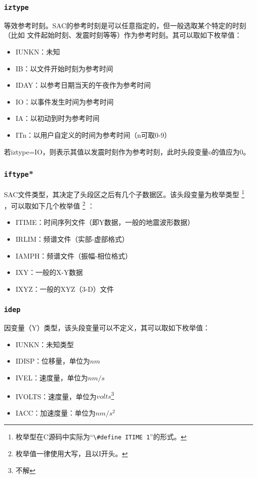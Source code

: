 \subsubsection{\texttt{iztype}}
等效参考时刻。SAC的参考时刻是可以任意指定的，但一般选取某个特定的时刻（比如
文件起始时刻、发震时刻等等）作为参考时刻。其可以取如下枚举值：
\begin{itemize}
\ttfamily
\item IUNKN：未知
\item IB：以文件开始时刻为参考时间
\item IDAY：以参考日期当天的午夜作为参考时间
\item IO：以事件发生时间为参考时间
\item IA：以初动到时为参考时间
\item ITn：以用户自定义的时间为参考时间（n可取0-9）
\end{itemize}

若iztype=IO，则表示其值以发震时刻作为参考时刻，此时头段变量o的值应为0。

\subsubsection{\texttt{iftype}*}
SAC文件类型，其决定了头段区之后有几个子数据区。该头段变量为枚举类型
\footnote{枚举型在C源码中实际为``\lstinline{\#define ITIME 1}''的形式。}
，可以取如下几个枚举值
\footnote{枚举值一律使用大写，且以I开头。} ：
\begin{itemize}
\ttfamily
\item ITIME：时间序列文件（即Y数据，一般的地震波形数据）
\item IRLIM：频谱文件（实部-虚部格式）
\item IAMPH：频谱文件（振幅-相位格式）
\item IXY：一般的X-Y数据
\item IXYZ：一般的XYZ（3-D）文件
\end{itemize}

\subsubsection{\texttt{idep}}
因变量（Y）类型，该头段变量可以不定义，其可以取如下枚举值：
\begin{itemize}
\ttfamily
\item IUNKN：未知类型
\item IDISP：位移量，单位为$nm$
\item IVEL：速度量，单位为$nm/s$
\item IVOLTS：速度量，单位为$volts$\footnote{不解}
\item IACC：加速度量：单位为$nm/s^2$	
\end{itemize}

